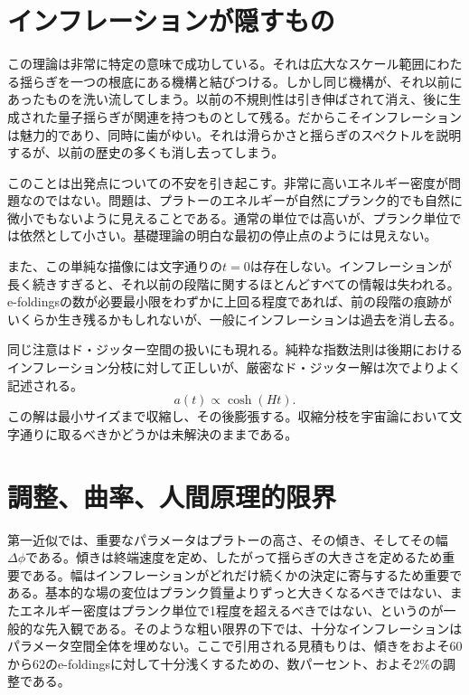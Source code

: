 \section{インフレーションが隠すもの}

この理論は非常に特定の意味で成功している。それは広大なスケール範囲にわたる揺らぎを一つの根底にある機構と結びつける。しかし同じ機構が、それ以前にあったものを洗い流してしまう。以前の不規則性は引き伸ばされて消え、後に生成された量子揺らぎが関連を持つものとして残る。だからこそインフレーションは魅力的であり、同時に歯がゆい。それは滑らかさと揺らぎのスペクトルを説明するが、以前の歴史の多くも消し去ってしまう。

このことは出発点についての不安を引き起こす。非常に高いエネルギー密度が問題なのではない。問題は、プラトーのエネルギーが自然にプランク的でも自然に微小でもないように見えることである。通常の単位では高いが、プランク単位では依然として小さい。基礎理論の明白な最初の停止点のようには見えない。

また、この単純な描像には文字通りの\(t=0\)は存在しない。インフレーションが長く続きすぎると、それ以前の段階に関するほとんどすべての情報は失われる。e-foldingsの数が必要最小限をわずかに上回る程度であれば、前の段階の痕跡がいくらか生き残るかもしれないが、一般にインフレーションは過去を消し去る。

同じ注意はド・ジッター空間の扱いにも現れる。純粋な指数法則は後期におけるインフレーション分枝に対して正しいが、厳密なド・ジッター解は次でよりよく記述される。
\begin{equation}
a(t)\propto \cosh(Ht).
\end{equation}
この解は最小サイズまで収縮し、その後膨張する。収縮分枝を宇宙論において文字通りに取るべきかどうかは未解決のままである。

\begin{classroomqa}
\end{classroomqa}

\section{調整、曲率、人間原理的限界}

第一近似では、重要なパラメータはプラトーの高さ、その傾き、そしてその幅\(\Delta\phi\)である。傾きは終端速度を定め、したがって揺らぎの大きさを定めるため重要である。幅はインフレーションがどれだけ続くかの決定に寄与するため重要である。基本的な場の変位はプランク質量よりずっと大きくなるべきではない、またエネルギー密度はプランク単位で1程度を超えるべきではない、というのが一般的な先入観である。そのような粗い限界の下では、十分なインフレーションはパラメータ空間全体を埋めない。ここで引用される見積もりは、傾きをおよそ\(60\)から\(62\)のe-foldingsに対して十分浅くするための、数パーセント、およそ\(2\%\)の調整である。

